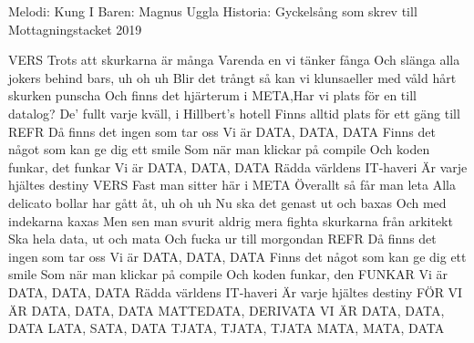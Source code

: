 \begin{song}

\begin{songmeta}
Melodi: Kung I Baren: Magnus Uggla
Historia: Gyckelsång som skrev till Mottagningstacket 2019
\end{songmeta}

\begin{songtext}
VERS
Trots att skurkarna är många
Varenda en vi tänker fånga
Och slänga alla jokers behind bars, uh oh uh
Blir det trångt så kan vi klunsaeller med våld hårt skurken punscha
Och finns det hjärterum i META,Har vi plats för en till datalog?
De’ fullt varje kväll, i Hillbert’s hotell
Finns alltid plats för ett gäng till
REFR
Då finns det ingen som tar oss
Vi är DATA, DATA, DATA
Finns det något som kan ge dig ett smile
Som när man klickar på compile
Och koden funkar, det funkar
Vi är DATA, DATA, DATA
Rädda världens IT-haveri
Är varje hjältes destiny
VERS
Fast man sitter här i META
Överallt så får man leta
Alla delicato bollar har gått åt, uh oh uh
Nu ska det genast ut och baxas
Och med indekarna kaxas
Men sen man svurit aldrig mera fighta skurkarna från arkitekt
Ska hela data, ut och mata
Och fucka ur till morgondan
REFR
Då finns det ingen som tar oss
Vi är DATA, DATA, DATA
Finns det något som kan ge dig ett smile
Som när man klickar på compile
Och koden funkar, den FUNKAR
Vi är DATA, DATA, DATA
Rädda världens IT-haveri
Är varje hjältes destiny
FÖR VI ÄR DATA, DATA, DATA
MATTEDATA, DERIVATA
VI ÄR DATA, DATA, DATA
LATA, SATA, DATA
TJATA, TJATA, TJATA
MATA, MATA, DATA
\end{songtext}
\end{song}
